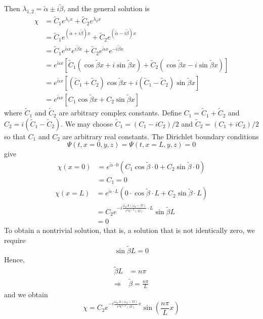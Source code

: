 \documentclass[english]{article}
\begin{document}
 Then $\lambda_{1,2}=\tilde{\alpha}\pm i\tilde{\beta}$, and the general
solution is 
\begin{align*}
\chi & =\tilde{C}_{1}e^{\lambda_{1}x}+\tilde{C}_{2}e^{\lambda_{2}x}\\
 & =\tilde{C}_{1}e^{\left(\tilde{\alpha}+i\tilde{\beta}\right)x}+\tilde{C}_{2}e^{\left(\tilde{\alpha}-i\tilde{\beta}\right)x}\\
 & =\tilde{C}_{1}e^{\tilde{\alpha}x}e^{i\tilde{\beta}x}+\tilde{C}_{2}e^{\tilde{\alpha}x}e^{-i\tilde{\beta}x}\\
 & =e^{\tilde{\alpha}x}\left[\tilde{C}_{1}\left(\cos\tilde{\beta}x+i\sin\tilde{\beta}x\right)+\tilde{C}_{2}\left(\cos\tilde{\beta}x-i\sin\tilde{\beta}x\right)\right]\\
 & =e^{\tilde{\alpha}x}\left[\left(\tilde{C}_{1}+\tilde{C}_{2}\right)\cos\tilde{\beta}x+i\left(\tilde{C}_{1}-\tilde{C}_{2}\right)\sin\tilde{\beta}x\right]\\
 & =e^{\tilde{\alpha}x}\left[C_{1}\cos\tilde{\beta}x+C_{2}\sin\tilde{\beta}x\right]
\end{align*}
 where $\tilde{C}_{1}$ and $\tilde{C}_{2}$ are arbitrary complex
constants. Define $C_{1}=\tilde{C}_{1}+\tilde{C}_{2}$ and $C_{2}=i\left(\tilde{C}_{1}-\tilde{C}_{2}\right)$.
We may choose $\tilde{C}_{1}=\left(C_{1}-iC_{2}\right)/2$ and $\tilde{C}_{2}=\left(C_{1}+iC_{2}\right)/2$
so that $C_{1}$ and $C_{2}$ are arbitrary real constants. The Dirichlet
boundary conditions 
\[
\Psi\left(t,x=0,y,z\right)=\Psi\left(t,x=L,y,z\right)=0
\]
 give 
\begin{align*}
\chi\left(x=0\right) & =e^{\tilde{\alpha}\cdot0}\left(C_{1}\cos\tilde{\beta}\cdot0+C_{2}\sin\tilde{\beta}\cdot0\right)\\
 & =C_{1}=0
\end{align*}
 {}
\begin{align*}
\chi\left(x=L\right) & =e^{\tilde{\alpha}\cdot L}\left(0\cdot\cos\tilde{\beta}\cdot L+C_{2}\sin\tilde{\beta}\cdot L\right)\\
 & =C_{2}e^{-i\frac{\omega_{n}A\left(\omega_{d}-\Omega\right)}{r^{3}C^{-2}\left(\Omega\right)}\cdot L}\sin\tilde{\beta}L\\
 & =0
\end{align*}
 To obtain a nontrivial solution, that is, a solution that is not
identically zero, we require 
\[
\sin\tilde{\beta}L=0
\]
 Hence, 
\begin{align*}
\tilde{\beta}L & =n\pi\\
\Rightarrow & \tilde{\beta}=\frac{n\pi}{L}
\end{align*}
 and we obtain 
\[
\chi=C_{2}e^{-i\frac{\omega_{n}A\left(\omega_{d}-\Omega\right)}{r^{3}C^{-2}\left(\Omega\right)}x}\sin\left(\frac{n\pi}{L}x\right)
\]
\end{document}
